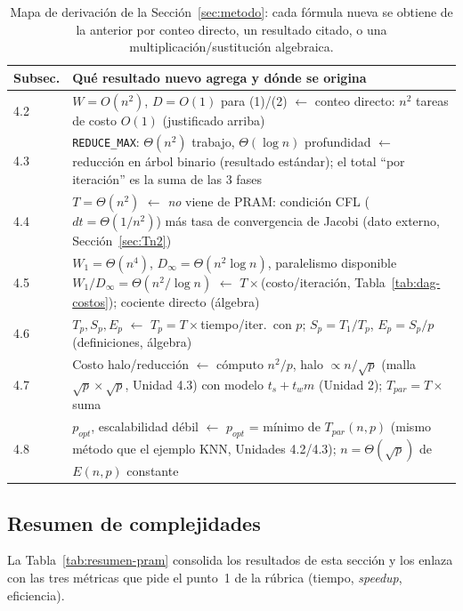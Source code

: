 \documentclass[11pt,a4paper]{article}
\begin{document}
	\begin{table}[H]
	\centering
	\scriptsize
	\setlength{\tabcolsep}{4pt}
	\renewcommand{\arraystretch}{0.95}
	\begin{tabularx}{\textwidth}{@{}l X@{}}
		\toprule
		\textbf{Subsec.} & \textbf{Qué resultado nuevo agrega y dónde se origina} \\
		\midrule
		4.2 & $W=O(n^2)$, $D=O(1)$ para (1)/(2) $\leftarrow$ conteo directo: $n^2$ tareas de costo $O(1)$ (justificado arriba) \\
		4.3 & \texttt{REDUCE\_MAX}: $\Theta(n^2)$ trabajo, $\Theta(\log n)$ profundidad $\leftarrow$ reducción en árbol binario (resultado estándar); el total ``por iteración'' es la suma de las 3 fases \\
		4.4 & $T=\Theta(n^2)$ $\leftarrow$ \textit{no} viene de PRAM: condición CFL ($dt=\Theta(1/n^2)$) más tasa de convergencia de Jacobi (dato externo, Sección~\ref{sec:Tn2}) \\
		4.5 & $W_1=\Theta(n^4)$, $D_\infty=\Theta(n^2\log n)$, paralelismo disponible $W_1/D_\infty=\Theta(n^2/\log n)$ $\leftarrow$ $T\times$(costo/iteración, Tabla~\ref{tab:dag-costos}); cociente directo (álgebra) \\
		4.6 & $T_p,S_p,E_p$ $\leftarrow$ $T_p=T\times$tiempo/iter.\ con $p$; $S_p=T_1/T_p$, $E_p=S_p/p$ (definiciones, álgebra) \\
		4.7 & Costo halo/reducción $\leftarrow$ cómputo $n^2/p$, halo $\propto n/\sqrt p$ (malla $\sqrt p\times\sqrt p$, Unidad 4.3) con modelo $t_s+t_wm$ (Unidad 2); $T_{par}=T\times$suma \\
		4.8 & $p_{opt}$, escalabilidad débil $\leftarrow$ $p_{opt}$ = mínimo de $T_{par}(n,p)$ (mismo método que el ejemplo KNN, Unidades 4.2/4.3); $n=\Theta(\sqrt p)$ de $E(n,p)$ constante \\
		\bottomrule
	\end{tabularx}
	\caption{Mapa de derivación de la Sección~\ref{sec:metodo}: cada fórmula nueva
	se obtiene de la anterior por conteo directo, un resultado citado, o una
	multiplicación/sustitución algebraica.}
	\label{tab:mapa-derivacion}
	\end{table}

	\subsection{Resumen de complejidades}
	\enlargethispage{4 \baselineskip}
	La Tabla~\ref{tab:resumen-pram} consolida los resultados de esta sección y los
	enlaza con las tres métricas que pide el punto~1 de la rúbrica (tiempo,
	\textit{speedup}, eficiencia).
\end{document}
